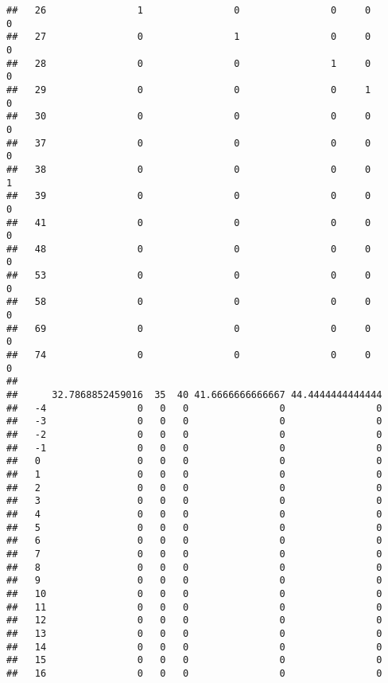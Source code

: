 \documentclass[]{article}
\begin{document}
\begin{verbatim}
##   26                1                0                0     0                0
##   27                0                1                0     0                0
##   28                0                0                1     0                0
##   29                0                0                0     1                0
##   30                0                0                0     0                0
##   37                0                0                0     0                0
##   38                0                0                0     0                1
##   39                0                0                0     0                0
##   41                0                0                0     0                0
##   48                0                0                0     0                0
##   53                0                0                0     0                0
##   58                0                0                0     0                0
##   69                0                0                0     0                0
##   74                0                0                0     0                0
##     
##      32.7868852459016  35  40 41.6666666666667 44.4444444444444
##   -4                0   0   0                0                0
##   -3                0   0   0                0                0
##   -2                0   0   0                0                0
##   -1                0   0   0                0                0
##   0                 0   0   0                0                0
##   1                 0   0   0                0                0
##   2                 0   0   0                0                0
##   3                 0   0   0                0                0
##   4                 0   0   0                0                0
##   5                 0   0   0                0                0
##   6                 0   0   0                0                0
##   7                 0   0   0                0                0
##   8                 0   0   0                0                0
##   9                 0   0   0                0                0
##   10                0   0   0                0                0
##   11                0   0   0                0                0
##   12                0   0   0                0                0
##   13                0   0   0                0                0
##   14                0   0   0                0                0
##   15                0   0   0                0                0
##   16                0   0   0                0                0

\end{verbatim}
\end{document}
